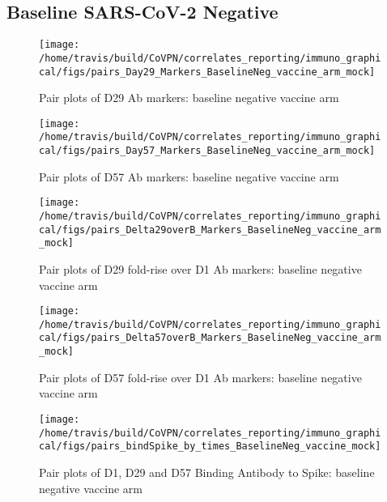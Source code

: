 \documentclass[]{book}
\theoremstyle{definition}
\theoremstyle{definition}
\theoremstyle{definition}
\newcommand{\1}{\mathbbm{1}}
\begin{document}
\hypertarget{baseline-sars-cov-2-negative}{%
\subsection{Baseline SARS-CoV-2 Negative}\label{baseline-sars-cov-2-negative}}

\begin{figure}[H]

{\centering \texttt{[image: /home/travis/build/CoVPN/correlates\_reporting/immuno\_graphical/figs/pairs\_Day29\_Markers\_BaselineNeg\_vaccine\_arm\_mock]} 

}

\caption{Pair plots of D29 Ab markers: baseline negative vaccine arm}\label{fig:unnamed-chunk-5}
\end{figure}

\begin{figure}[H]

{\centering \texttt{[image: /home/travis/build/CoVPN/correlates\_reporting/immuno\_graphical/figs/pairs\_Day57\_Markers\_BaselineNeg\_vaccine\_arm\_mock]} 

}

\caption{Pair plots of D57 Ab markers: baseline negative vaccine arm}\label{fig:unnamed-chunk-6}
\end{figure}

\begin{figure}[H]

{\centering \texttt{[image: /home/travis/build/CoVPN/correlates\_reporting/immuno\_graphical/figs/pairs\_Delta29overB\_Markers\_BaselineNeg\_vaccine\_arm\_mock]} 

}

\caption{Pair plots of D29 fold-rise over D1 Ab markers: baseline negative vaccine arm}\label{fig:unnamed-chunk-7}
\end{figure}

\begin{figure}[H]

{\centering \texttt{[image: /home/travis/build/CoVPN/correlates\_reporting/immuno\_graphical/figs/pairs\_Delta57overB\_Markers\_BaselineNeg\_vaccine\_arm\_mock]} 

}

\caption{Pair plots of D57 fold-rise over D1 Ab markers: baseline negative vaccine arm}\label{fig:unnamed-chunk-8}
\end{figure}

\begin{figure}[H]

{\centering \texttt{[image: /home/travis/build/CoVPN/correlates\_reporting/immuno\_graphical/figs/pairs\_bindSpike\_by\_times\_BaselineNeg\_vaccine\_mock]} 

}

\caption{Pair plots of D1, D29 and D57 Binding Antibody to Spike: baseline negative vaccine arm}\label{fig:unnamed-chunk-9}
\end{figure}
\end{document}
